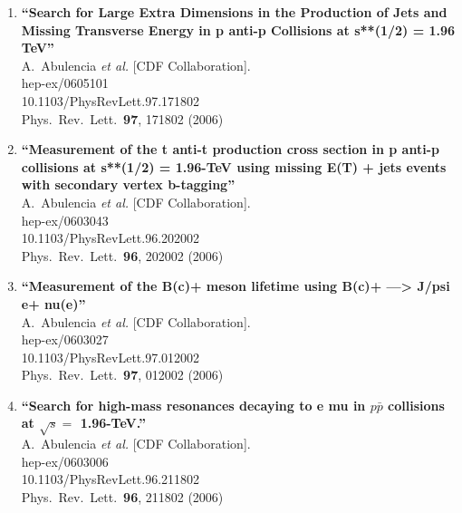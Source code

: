 \documentclass{article}
\begin{document}
\begin{enumerate}
\item%
{\bf ``Search for Large Extra Dimensions in the Production of Jets and Missing Transverse Energy in p anti-p Collisions at s**(1/2) = 1.96 TeV''}
  \\{}A.~Abulencia {\it et al.}  [CDF Collaboration].
  \\{}hep-ex/0605101
    \\{}10.1103/PhysRevLett.97.171802
\\{}Phys.\ Rev.\ Lett.\  {\bf 97}, 171802 (2006) %


\item%
{\bf ``Measurement of the t anti-t production cross section in p anti-p collisions at s**(1/2) = 1.96-TeV using missing E(T) + jets events with secondary vertex b-tagging''}
  \\{}A.~Abulencia {\it et al.}  [CDF Collaboration].
  \\{}hep-ex/0603043
    \\{}10.1103/PhysRevLett.96.202002
\\{}Phys.\ Rev.\ Lett.\  {\bf 96}, 202002 (2006) %


\item%
{\bf ``Measurement of the B(c)+ meson lifetime using B(c)+ ---> J/psi e+ nu(e)''}
  \\{}A.~Abulencia {\it et al.}  [CDF Collaboration].
  \\{}hep-ex/0603027
    \\{}10.1103/PhysRevLett.97.012002
\\{}Phys.\ Rev.\ Lett.\  {\bf 97}, 012002 (2006) %


\item%
{\bf ``Search for high-mass resonances decaying to e mu in $p\bar{p}$ collisions at $\sqrt{s} =$ 1.96-TeV.''}
  \\{}A.~Abulencia {\it et al.}  [CDF Collaboration].
  \\{}hep-ex/0603006
    \\{}10.1103/PhysRevLett.96.211802
\\{}Phys.\ Rev.\ Lett.\  {\bf 96}, 211802 (2006) %



\end{enumerate}
\end{document}

